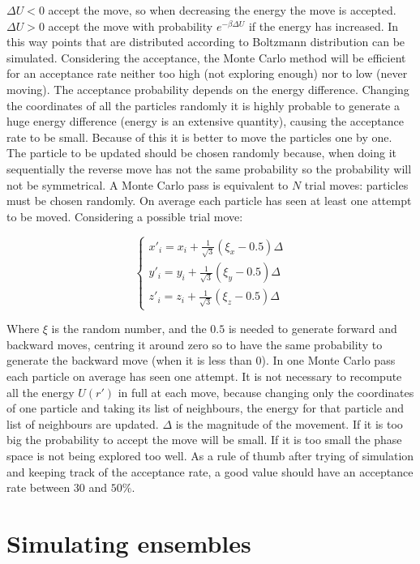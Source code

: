 	$\Delta U < 0$ accept the move, so when decreasing the energy the move is accepted.
	$\Delta U > 0$ accept the move with probability $e^{-\beta\Delta U}$ if the energy has increased.
	In this way points that are distributed according to Boltzmann distribution can be simulated.
	Considering the acceptance, the Monte Carlo method will be efficient for an acceptance rate neither too high (not exploring enough) nor to low (never moving).
	The acceptance probability depends on the energy difference.
	Changing the coordinates of all the particles randomly it is highly probable to generate a huge energy difference (energy is an extensive quantity), causing the acceptance rate to be small.
	Because of this it is better to move the particles one by one.
	The particle to be updated should be chosen randomly because, when doing it sequentially the reverse move has not the same probability so the probability will not be symmetrical.
	A Monte Carlo pass is equivalent to $N$ trial moves: particles must be chosen randomly.
	On average each particle has seen at least one attempt to be moved.
	Considering a possible trial move:

	$$\begin{cases}x'_i = x_i+\frac{1}{\sqrt{3}}(\xi_x-0.5)\Delta\\y'_i = y_i+\frac{1}{\sqrt{3}}(\xi_y-0.5)\Delta\\z'_i = z_i+\frac{1}{\sqrt{3}}(\xi_z-0.5)\Delta\end{cases}$$

	Where $\xi$ is the random number, and the $0.5$ is needed to generate forward and backward moves, centring it around zero so to have the same probability to generate the backward move (when it is less than $0$).
	In one Monte Carlo pass each particle on average has seen one attempt.
	It is not necessary to recompute all the energy $U(r')$ in full at each move, because changing only the coordinates of one particle and taking its list of neighbours, the energy for that particle and list of neighbours are updated.
	$\Delta$ is the magnitude of the movement.
	If it is too big the probability to accept the move will be small.
	If it is too small the phase space is not being explored too well.
	As a rule of thumb after trying of simulation and keeping track of the acceptance rate, a good value should have an acceptance rate between $30$ and $50\%$.

\section{Simulating ensembles}


